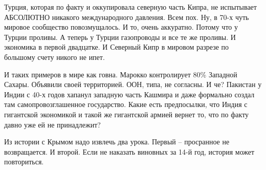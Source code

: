 Турция, которая по факту и оккупировала северную часть Кипра, не испытывает
АБСОЛЮТНО никакого международного давления. Всем пох. Ну, в 70-х чуть мировое
сообщество повозмущалось. И то, очень аккуратно. Потому что у Турции проливы. А
теперь у Турции газопроводы и все те же проливы. И экономика в первой
двадцатке. И Северный Кипр в мировом разрезе по большому счету никого не ипет.

И таких примеров в мире как говна. Марокко контролирует 80\% Западной Сахары.
Объявили своей территорией. ООН, типа, не согласны. И че? Пакистан у Индии с
40-х годов хапанул западную часть Кашмира и даже формально создал там
самопровозглашенное государство. Какие есть предпосылки, что Индия с гигантской
экономикой и такой же гигантской армией вернет то, что по факту давно уже ей не
принадлежит?

Из истории с Крымом надо извлечь два урока. Первый – просранное не
возвращается. И второй. Если не наказать виновных за 14-й год, история может
повториться.

